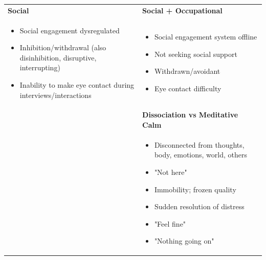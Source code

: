 \documentclass[12pt,letterpaper]{book}
\newenvironment{compactitemize}
{\begin{itemize}[nosep, leftmargin=1em, itemsep=0pt, topsep=0pt]}
{\end{itemize}}
\begin{document}
\begin{longtable}{p{}|p{}}
\textbf{Social} & \textbf{Social + Occupational} \\*
\begin{compactitemize}
\item Social engagement dysregulated
\item Inhibition/withdrawal (also disinhibition, disruptive, interrupting)
\item Inability to make eye contact during interviews/interactions
\end{compactitemize}
&
\begin{compactitemize}
\item Social engagement system offline
\item Not seeking social support
\item Withdrawn/avoidant
\item Eye contact difficulty
\end{compactitemize} \\[1ex]

& \textbf{Dissociation vs Meditative Calm} \\*
&
\begin{compactitemize}
\item Disconnected from thoughts, body, emotions, world, others
\item "Not here"
\item Immobility; frozen quality
\item Sudden resolution of distress
\item "Feel fine"
\item "Nothing going on"
\end{compactitemize} \\

\end{longtable}
\end{document}
